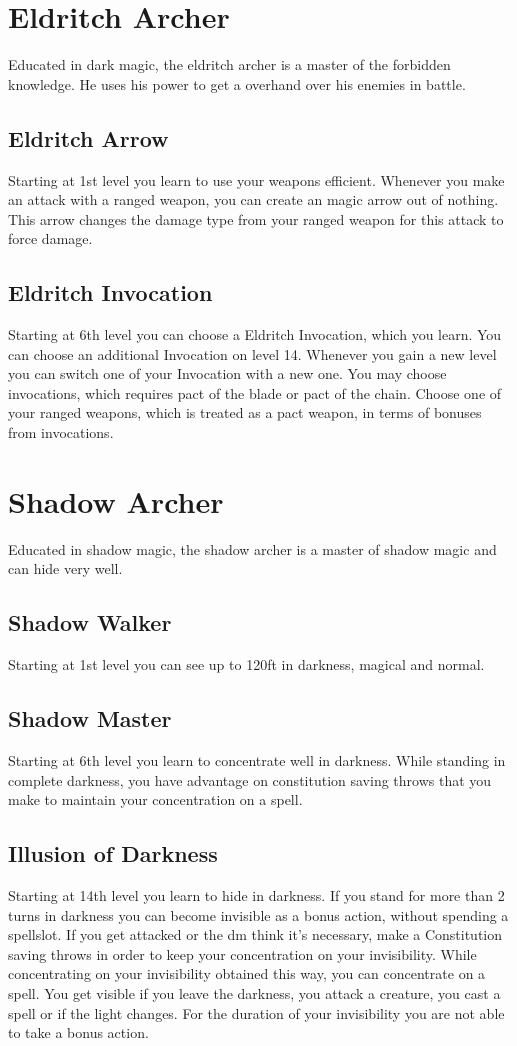 \documentclass[a4paper,10pt,twoside,twocolumn, bg=print]{dndbook} %
\begin{document}
	\section{Eldritch Archer}
		Educated in dark magic, the eldritch archer is a master of the forbidden knowledge. He uses his power to get a overhand over his enemies in battle.
		\subsection{Eldritch Arrow}
			Starting at 1st level you learn to use your weapons efficient. Whenever you make an attack with a ranged weapon, you can create an magic arrow out of nothing. This arrow changes the damage type from your ranged weapon for this attack to force damage.
		\subsection{Eldritch Invocation}
			Starting at 6th level you can choose a Eldritch Invocation, which you learn. You can choose an additional Invocation on level 14. Whenever you gain a new level you can switch one of your Invocation with a new one. You may choose invocations, which requires pact of the blade or pact of the chain. Choose one of your ranged weapons, which is treated as a pact weapon, in terms of bonuses from invocations.
	\section{Shadow Archer}
		Educated in shadow magic, the shadow archer is a master of shadow magic and can hide very well.
		\subsection{Shadow Walker}
			Starting at 1st level you can see up to 120ft in darkness, magical and normal.
		\subsection{Shadow Master}
			Starting at 6th level you learn to concentrate well in darkness. While standing in complete darkness, you have advantage on constitution saving throws that you make to maintain your concentration on a spell.
		\subsection{Illusion of Darkness}
			Starting at 14th level you learn to hide in darkness. If you stand for more than 2 turns in darkness you can become invisible as a bonus action, without spending a spellslot. If you get attacked or the dm think it's necessary, make a Constitution saving throws in order to keep your concentration on your invisibility. While concentrating on your invisibility obtained this way, you can concentrate on a spell. You get visible if you leave the darkness, you attack a creature, you cast a spell or if the light changes. For the duration of your invisibility you are not able to take a bonus action.
\end{document}
